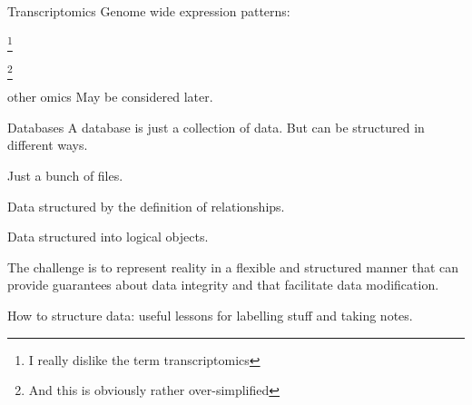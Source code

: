 \documentclass[pdf]{beamer}
\newcommand\blfootnote[1]{%
  \begingroup  %
  \renewcommand\thefootnote{}\footnote{#1}%
  \addtocounter{footnote}{-1}  %
  \endgroup
}
\begin{document}
\begin{frame}{Transcriptomics}
  Genome wide expression patterns:
  \begin{figure}[ht]
  \end{figure}
  \blfootnote{I really dislike the term transcriptomics}
  \blfootnote{And this is obviously rather over-simplified}
\end{frame}


\begin{frame}{other omics}
  May be considered later.
\end{frame}

\begin{frame}{Databases}
  A database is just a collection of data.
  \pause
  But can be structured in different ways.
  \begin{description}
    \item[Flat file] Just a bunch of files.
    \item[Relational] Data structured by the definition of relationships.
    \item[Object orientated] Data structured into logical objects.
  \end{description}
  \pause
  The challenge is to represent reality in a flexible and structured manner that can provide
  guarantees about data integrity and that facilitate data modification.
  
  \pause
  How to structure data: useful lessons for labelling stuff and taking notes.
\end{frame}
\end{document}
